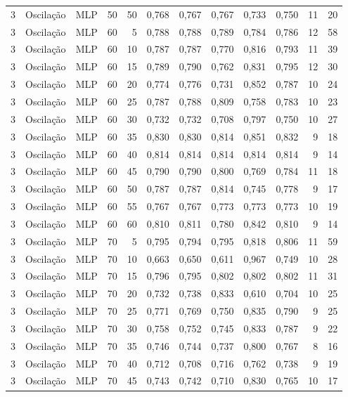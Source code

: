 \begin{longtable}{@{}rllrrrrrrrrr@{}}
3 & Oscilação & MLP & 50 & 50 & 0,768 & 0,767 & 0,767 & 0,733 & 0,750 & 11 & 20 \\
3 & Oscilação & MLP & 60 & 5 & 0,788 & 0,788 & 0,789 & 0,784 & 0,786 & 12 & 58 \\
3 & Oscilação & MLP & 60 & 10 & 0,787 & 0,787 & 0,770 & 0,816 & 0,793 & 11 & 39 \\
3 & Oscilação & MLP & 60 & 15 & 0,789 & 0,790 & 0,762 & 0,831 & 0,795 & 12 & 30 \\
3 & Oscilação & MLP & 60 & 20 & 0,774 & 0,776 & 0,731 & 0,852 & 0,787 & 10 & 24 \\
3 & Oscilação & MLP & 60 & 25 & 0,787 & 0,788 & 0,809 & 0,758 & 0,783 & 10 & 23 \\
3 & Oscilação & MLP & 60 & 30 & 0,732 & 0,732 & 0,708 & 0,797 & 0,750 & 10 & 27 \\
3 & Oscilação & MLP & 60 & 35 & 0,830 & 0,830 & 0,814 & 0,851 & 0,832 & 9 & 18 \\
3 & Oscilação & MLP & 60 & 40 & 0,814 & 0,814 & 0,814 & 0,814 & 0,814 & 9 & 14 \\
3 & Oscilação & MLP & 60 & 45 & 0,790 & 0,790 & 0,800 & 0,769 & 0,784 & 11 & 18 \\
3 & Oscilação & MLP & 60 & 50 & 0,787 & 0,787 & 0,814 & 0,745 & 0,778 & 9 & 17 \\
3 & Oscilação & MLP & 60 & 55 & 0,767 & 0,767 & 0,773 & 0,773 & 0,773 & 10 & 19 \\
3 & Oscilação & MLP & 60 & 60 & 0,810 & 0,811 & 0,780 & 0,842 & 0,810 & 9 & 14 \\
3 & Oscilação & MLP & 70 & 5 & 0,795 & 0,794 & 0,795 & 0,818 & 0,806 & 11 & 59 \\
3 & Oscilação & MLP & 70 & 10 & 0,663 & 0,650 & 0,611 & 0,967 & 0,749 & 10 & 28 \\
3 & Oscilação & MLP & 70 & 15 & 0,796 & 0,795 & 0,802 & 0,802 & 0,802 & 11 & 31 \\
3 & Oscilação & MLP & 70 & 20 & 0,732 & 0,738 & 0,833 & 0,610 & 0,704 & 10 & 25 \\
3 & Oscilação & MLP & 70 & 25 & 0,771 & 0,769 & 0,750 & 0,835 & 0,790 & 9 & 25 \\
3 & Oscilação & MLP & 70 & 30 & 0,758 & 0,752 & 0,745 & 0,833 & 0,787 & 9 & 22 \\
3 & Oscilação & MLP & 70 & 35 & 0,746 & 0,744 & 0,737 & 0,800 & 0,767 & 8 & 16 \\
3 & Oscilação & MLP & 70 & 40 & 0,712 & 0,708 & 0,716 & 0,762 & 0,738 & 9 & 19 \\
3 & Oscilação & MLP & 70 & 45 & 0,743 & 0,742 & 0,710 & 0,830 & 0,765 & 10 & 17 \\

\end{longtable}
